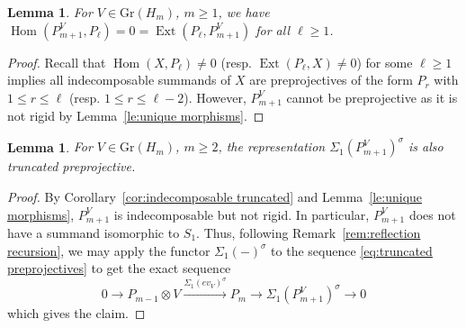 \documentclass{amsart}
\newtheorem{lemma}[theorem]{Lemma}
\numberwithin{equation}{section}
\newcommand\udim{{\underline{\dim}\, }}
\newcommand{\Gr}{\mathrm{Gr}}
\newcommand{\Ext}{\operatorname{Ext}}
\newcommand{\Hom}{\operatorname{Hom}}
\begin{document}
\begin{lemma}
  \label{le:basic homological properties}
  For $V\in\Gr(H_m)$, $m\ge1$, we have $\Hom(P_{m+1}^V,P_\ell)=0=\Ext(P_\ell,P_{m+1}^V)$ for all $\ell\ge1$.
\end{lemma}
\begin{proof}
  Recall that $\Hom(X,P_\ell)\ne0$ (resp. $\Ext(P_\ell,X)\ne0$) for some $\ell\ge1$ implies all indecomposable summands of $X$ are preprojectives of the form $P_r$ with $1\le r\le\ell$ (resp. $1\le r\le\ell-2$).
  However, $P_{m+1}^V$ cannot be preprojective as it is not rigid by Lemma~\ref{le:unique morphisms}.
\end{proof}

\begin{lemma}
  \label{le:reflected truncated preprojectives}
  For $V\in\Gr(H_m)$, $m\ge2$, the representation $\Sigma_1(P_{m+1}^V)^\sigma$ is also truncated preprojective.
\end{lemma}
\begin{proof}
  By Corollary~\ref{cor:indecomposable truncated} and Lemma~\ref{le:unique morphisms}, $P_{m+1}^V$ is indecomposable but not rigid.
  In particular, $P_{m+1}^V$ does not have a summand isomorphic to $S_1$.
  Thus, following Remark~\ref{rem:reflection recursion}, we may apply the functor $\Sigma_1(-)^\sigma$ to the sequence \eqref{eq:truncated preprojectives} to get the exact sequence
  \[0\longrightarrow P_{m-1}\otimes V\xrightarrow{\Sigma_1(ev_V)^\sigma} P_m\longrightarrow \Sigma_1(P_{m+1}^V)^\sigma\longrightarrow 0\]
  which gives the claim.
\end{proof}
\end{document}
